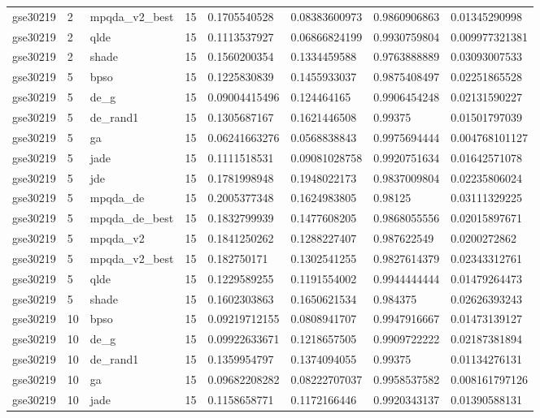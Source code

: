 \begin{table}[t]
\begin{tabular}{llllllll}
gse30219 & 2 & mpqda\_v2\_best & 15 & 0.1705540528 & 0.08383600973 & 0.9860906863 & 0.01345290998 \\
gse30219 & 2 & qlde & 15 & 0.1113537927 & 0.06866824199 & 0.9930759804 & 0.009977321381 \\
gse30219 & 2 & shade & 15 & 0.1560200354 & 0.1334459588 & 0.9763888889 & 0.03093007533 \\
gse30219 & 5 & bpso & 15 & 0.1225830839 & 0.1455933037 & 0.9875408497 & 0.02251865528 \\
gse30219 & 5 & de\_g & 15 & 0.09004415496 & 0.124464165 & 0.9906454248 & 0.02131590227 \\
gse30219 & 5 & de\_rand1 & 15 & 0.1305687167 & 0.1621446508 & 0.99375 & 0.01501797039 \\
gse30219 & 5 & ga & 15 & 0.06241663276 & 0.0568838843 & 0.9975694444 & 0.004768101127 \\
gse30219 & 5 & jade & 15 & 0.1111518531 & 0.09081028758 & 0.9920751634 & 0.01642571078 \\
gse30219 & 5 & jde & 15 & 0.1781998948 & 0.1948022173 & 0.9837009804 & 0.02235806024 \\
gse30219 & 5 & mpqda\_de & 15 & 0.2005377348 & 0.1624983805 & 0.98125 & 0.03111329225 \\
gse30219 & 5 & mpqda\_de\_best & 15 & 0.1832799939 & 0.1477608205 & 0.9868055556 & 0.02015897671 \\
gse30219 & 5 & mpqda\_v2 & 15 & 0.1841250262 & 0.1288227407 & 0.987622549 & 0.0200272862 \\
gse30219 & 5 & mpqda\_v2\_best & 15 & 0.182750171 & 0.1302541255 & 0.9827614379 & 0.02343312761 \\
gse30219 & 5 & qlde & 15 & 0.1229589255 & 0.1191554002 & 0.9944444444 & 0.01479264473 \\
gse30219 & 5 & shade & 15 & 0.1602303863 & 0.1650621534 & 0.984375 & 0.02626393243 \\
gse30219 & 10 & bpso & 15 & 0.09219712155 & 0.0808941707 & 0.9947916667 & 0.01473139127 \\
gse30219 & 10 & de\_g & 15 & 0.09922633671 & 0.1218657505 & 0.9909722222 & 0.02187381894 \\
gse30219 & 10 & de\_rand1 & 15 & 0.1359954797 & 0.1374094055 & 0.99375 & 0.01134276131 \\
gse30219 & 10 & ga & 15 & 0.09682208282 & 0.08222707037 & 0.9958537582 & 0.008161797126 \\
gse30219 & 10 & jade & 15 & 0.1158658771 & 0.1172166446 & 0.9920343137 & 0.01390588131 \\

\end{tabular}
\end{table}
